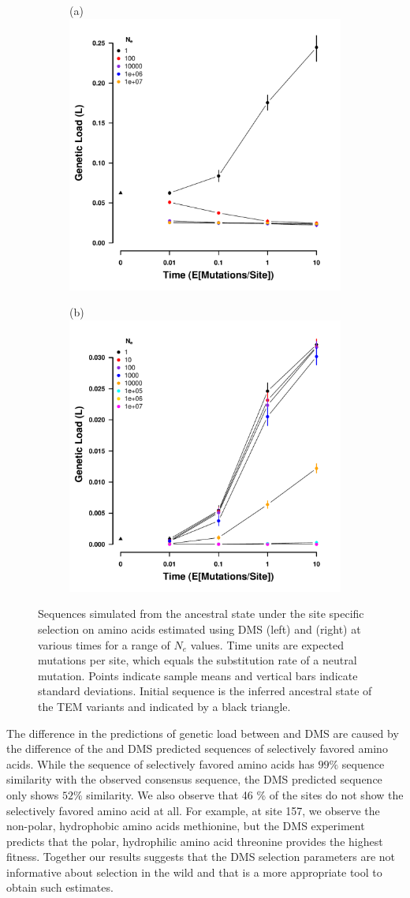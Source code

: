 \documentclass[12pt]{article}
\begin{document}
\begin{figure}
    \centering
    \begin{subfigure}
        \centering
        (a)\includegraphics[width=.45\textwidth]{img/simulated_gl_time_DMS_ancest.pdf}
    \end{subfigure}
    \begin{subfigure}
        \centering
        (b)\includegraphics[width=.45\textwidth]{img/simulated_gl_time_SELAC_ancest.pdf}
    \end{subfigure}
    \caption{Sequences simulated from the ancestral state under the site specific selection on amino acids estimated using DMS (left) and \selac (right) at various times for a range of $N_e$ values.
    Time units are expected mutations per site, which equals the substitution rate of a neutral mutation.
    Points indicate sample means and vertical bars indicate standard deviations. Initial sequence is the inferred ancestral state of the TEM variants and indicated by a black triangle.}
    \label{fig:gl_sim}
\end{figure}

The difference in the predictions of genetic load between \selac and DMS are caused by the difference of the \selac and DMS predicted sequences of selectively favored amino acids.
While the \selac sequence of selectively favored amino acids has $99 \%$ sequence similarity with the observed consensus sequence, the DMS predicted sequence only shows $52 \%$ similarity.
We also observe that 46 \% of the sites do not show the selectively favored amino acid at all.
For example, at site 157, we observe the non-polar, hydrophobic amino acids methionine, but the DMS experiment predicts that the polar, hydrophilic amino acid threonine provides the highest fitness.
Together our results suggests that the DMS selection parameters are not informative about selection in the wild and that \selac is a more appropriate tool to obtain such estimates.
\end{document}
